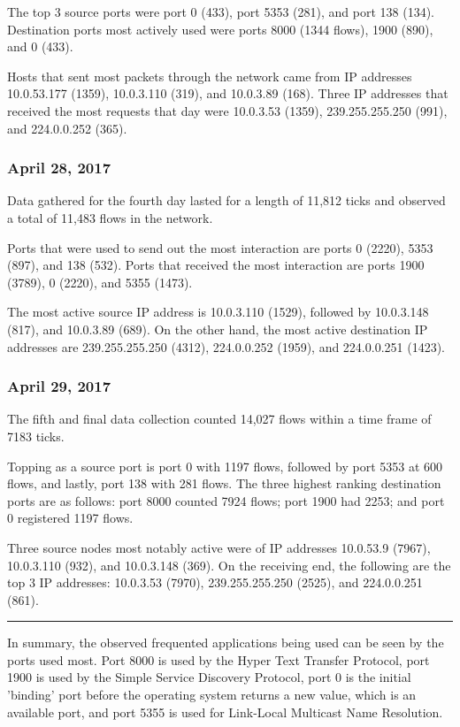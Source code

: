 \documentclass[journal]{IEEE/IEEEtran}
\begin{document}
The top 3 source ports were port 0 (433), port 5353 (281), and port 138 (134). Destination ports most actively used were ports 8000 (1344 flows), 1900 (890), and 0 (433).

Hosts that sent most packets through the network came from IP addresses 10.0.53.177 (1359), 10.0.3.110 (319), and 10.0.3.89 (168). Three IP addresses that received the most requests that day were 10.0.3.53 (1359), 239.255.255.250 (991), and 224.0.0.252 (365).

\subsubsection{\textbf{April 28, 2017}}

Data gathered for the fourth day lasted for a length of 11,812 ticks and observed a total of 11,483 flows in the network.

Ports that were used to send out the most interaction are ports 0 (2220), 5353 (897), and 138 (532). Ports that received the most interaction are ports 1900 (3789), 0 (2220), and 5355 (1473).

The most active source IP address is 10.0.3.110 (1529), followed by 10.0.3.148 (817), and 10.0.3.89 (689). On the other hand, the most active destination IP addresses are 239.255.255.250 (4312), 224.0.0.252 (1959), and 224.0.0.251 (1423).


\subsubsection{\textbf{April 29, 2017}}

The fifth and final data collection counted 14,027 flows within a time frame of 7183 ticks.

Topping as a source port is port 0 with 1197 flows, followed by port 5353 at 600 flows, and lastly, port 138 with 281 flows. The three highest ranking destination ports are as follows: port 8000 counted 7924 flows; port 1900 had 2253; and port 0 registered 1197 flows.

Three source nodes most notably active were of IP addresses 10.0.53.9 (7967), 10.0.3.110 (932), and 10.0.3.148 (369). On the receiving end, the following are the top 3 IP addresses: 10.0.3.53 (7970), 239.255.255.250 (2525), and 224.0.0.251 (861).
\linebreak
\hrule

In summary, the observed frequented applications being used can be seen by the ports used most. Port 8000 is used by the Hyper Text Transfer Protocol, port 1900 is used by the Simple Service Discovery Protocol, port 0 is the initial 'binding' port before the operating system returns a new value, which is an available port, and port 5355 is used for Link-Local Multicast Name Resolution.
\end{document}
